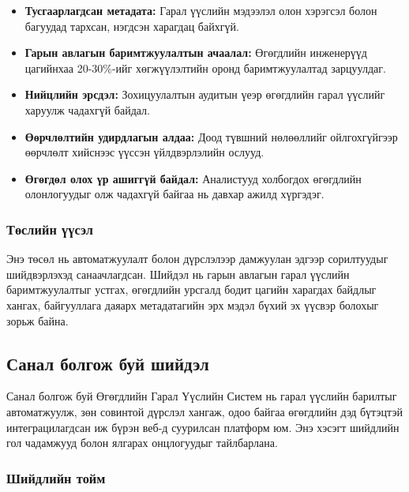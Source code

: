 \begin{itemize}
    \item \textbf{Тусгаарлагдсан метадата:} Гарал үүслийн мэдээлэл олон хэрэгсэл болон багуудад тархсан, нэгдсэн харагдац байхгүй.
    
    \item \textbf{Гарын авлагын баримтжуулалтын ачаалал:} Өгөгдлийн инженерүүд цагийнхаа 20-30\%-ийг хөгжүүлэлтийн оронд баримтжуулалтад зарцуулдаг.
    
    \item \textbf{Нийцлийн эрсдэл:} Зохицуулалтын аудитын үеэр өгөгдлийн гарал үүслийг харуулж чадахгүй байдал.
    
    \item \textbf{Өөрчлөлтийн удирдлагын алдаа:} Доод түвшний нөлөөллийг ойлгохгүйгээр өөрчлөлт хийснээс үүссэн үйлдвэрлэлийн ослууд.
    
    \item \textbf{Өгөгдөл олох үр ашиггүй байдал:} Аналистууд холбогдох өгөгдлийн олонлогуудыг олж чадахгүй байгаа нь давхар ажилд хүргэдэг.
\end{itemize}

\subsubsection{Төслийн үүсэл}

Энэ төсөл нь автоматжуулалт болон дүрслэлээр дамжуулан эдгээр сорилтуудыг шийдвэрлэхэд санаачлагдсан. Шийдэл нь гарын авлагын гарал үүслийн баримтжуулалтыг устгах, өгөгдлийн урсгалд бодит цагийн харагдах байдлыг хангах, байгууллага даяарх метадатагийн эрх мэдэл бүхий эх үүсвэр болохыг зорьж байна.

\subsection{Санал болгож буй шийдэл}
\label{subsec:dl_proposed_solution}

Санал болгож буй Өгөгдлийн Гарал Үүслийн Систем нь гарал үүслийн барилтыг автоматжуулж, зөн совинтой дүрслэл хангаж, одоо байгаа өгөгдлийн дэд бүтэцтэй интеграцилагдсан иж бүрэн веб-д суурилсан платформ юм. Энэ хэсэгт шийдлийн гол чадамжууд болон ялгарах онцлогуудыг тайлбарлана.

\subsubsection{Шийдлийн тойм}

